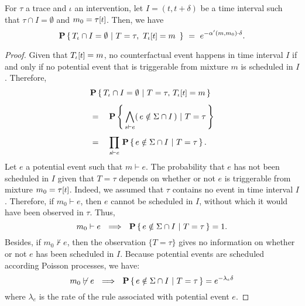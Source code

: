 \begin{proposition*}
  For $\tau$ a trace
  and $\iota$ an intervention, let $I = (t, t+\delta)$ be a time interval
  such that $\tau \cap I = \emptyset$ and $m_0 =
  \TSTATE{t}{\tau}$. Then, we have
  \[\CProb{ \ATRAJ{} \cap I = \emptyset }{ T=\tau,\
      \TSTATE{t}{\ATRAJ{}} = m\ }
    \ =\ e^{-\alpha'(m, m_0) \cdot \delta}.
  \]
\end{proposition*}
\begin{proof}

  Given that $\TSTATE{t}{\ATRAJ{}} = m$, no counterfactual event
  happens in time interval $I$ if and only if no potential event that
  is triggerable from mixture $m$ is scheduled in $I$. Therefore,
  \vskip 0.0cm
  \begin{equation}\label{eqn:scheduled-decomposition}
    \begin{aligned}
      &\CProb{ \ATRAJ{} \cap I = \emptyset } { T=\tau,\,
        \TSTATE{t}{\ATRAJ{}} = m }
      \\[0.4em]
      &= \quad \CProb{ \bigwedge_{s \vdash e} (\,e \notin \Sigma \cap
        I \,) }{ T=\tau }
      \\[0.4em]
      &= \quad \prod_{s \vdash e}\, \CProb{e \notin \Sigma \cap I }{
        T=\tau }.
    \end{aligned}
  \end{equation}
  \vskip 0.2cm Let $e$ a potential event such that $m \vdash e$. The
  probability that $e$ has not been scheduled in $I$ given that
  $T=\tau$ depends on whether or not $e$ is triggerable from mixture
  $m_0 = \TSTATE{t}{\tau}$. Indeed, we assumed that $\tau$ contains no
  event in time interval $I$. Therefore, if $m_0 \vdash e$, then $e$
  cannot be scheduled in $I$, without which it would have been
  observed in $\tau$.  Thus,
  \begin{equation}\label{eqn:pscheduled1}
    m_0 \vdash e \ \ \Longrightarrow\ \ \mathbf{P} \left\{\, e \notin \Sigma \cap I \ |\ T=\tau  \,\right\} = 1.
  \end{equation}
  Besides, if $m_0 \not\vdash e$, then the observation $\{ T=\tau \}$
  gives no information on whether or not $e$ has been scheduled in
  $I$. Because potential events are scheduled according Poisson
  processes, we have:
  \begin{equation}\label{eqn:pscheduled2}
    m_0 \not\vdash e \ \ \Longrightarrow\ \ \mathbf{P} \left\{\, e \notin \Sigma \cap I \ |\ 
      T=\tau  \,\right\} = e^{-\lambda_e \delta}
  \end{equation} where $\lambda_e$ is the rate of the rule associated with potential event $e$.

\end{proof}
